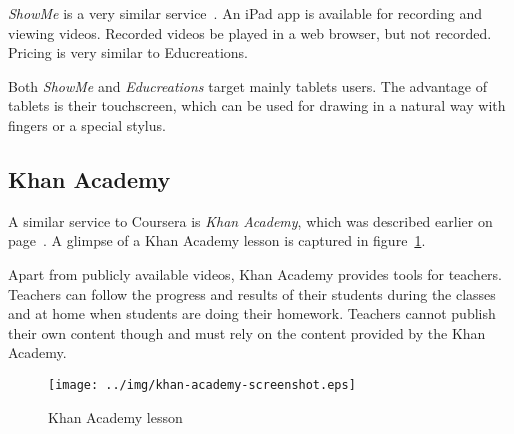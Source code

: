 \textit{ShowMe} is a very similar service~\cite{showme}. An iPad app is available for recording and viewing videos. Recorded videos be played in a web browser, but not recorded. Pricing is very similar to Educreations.

Both \textit{ShowMe} and \textit{Educreations} target mainly tablets users. The advantage of tablets is their touchscreen, which can be used for drawing in a natural way with fingers or a special stylus.



\subsection{Khan Academy}
A similar service to Coursera is \textit{Khan Academy}, which was described earlier on page~\pageref{sec:khan-academy}. A glimpse of a Khan Academy lesson is captured in figure~\ref{fig:khan-screen}.

Apart from publicly available videos, Khan Academy provides tools for teachers. Teachers can follow the progress and results of their students during the classes and at home when students are doing their homework. Teachers cannot publish their own content though and must rely on the content provided by the Khan Academy.

\begin{figure}
	\centering
		\texttt{[image: ../img/khan-academy-screenshot.eps]}
		\caption{Khan Academy lesson\label{fig:khan-screen}}		
\end{figure}